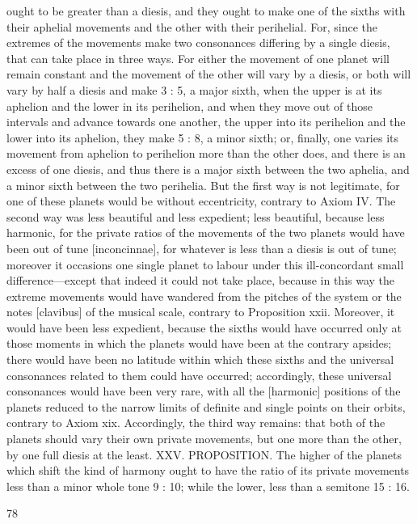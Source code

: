 \documentclass{article}
\begin{document}
ought to be greater than a diesis, and they ought to make one of the
sixths with their aphelial movements and the other with their perihelial.
For, since the extremes of the movements make two consonances
differing by a single diesis, that can take place in three ways. For either
the movement of one planet will remain constant and the movement of
the other will vary by a diesis, or both will vary by half a diesis and make
3 : 5, a major sixth, when the upper is at its aphelion and the lower in its
perihelion, and when they move out of those intervals and advance
towards one another, the upper into its perihelion and the lower into its
aphelion, they make 5 : 8, a minor sixth; or, finally, one varies its
movement from aphelion to perihelion more than the other does, and
there is an excess of one diesis, and thus there is a major sixth between
the two aphelia, and a minor sixth between the two perihelia. But the
first way is not legitimate, for one of these planets would be without
eccentricity, contrary to Axiom IV. The second way was less beautiful
and less expedient; less beautiful, because less harmonic, for the private
ratios of the movements of the two planets would have been out of tune
[inconcinnae], for whatever is less than a diesis is out of tune; moreover
it occasions one single planet to labour under this ill-concordant small
difference—except that indeed it could not take place, because in this
way the extreme movements would have wandered from the pitches of
the system or the notes [clavibus] of the musical scale, contrary to
Proposition xxii. Moreover, it would have been less expedient, because
the sixths would have occurred only at those moments in which the
planets would have been at the contrary apsides; there would have been
no latitude within which these sixths and the universal consonances
related to them could have occurred; accordingly, these universal
consonances would have been very rare, with all the [harmonic]
positions of the planets reduced to the narrow limits of definite and
single points on their orbits, contrary to Axiom xix. Accordingly, the
third way remains: that both of the planets should vary their own private
movements, but one more than the other, by one full diesis at the least.
XXV. PROPOSITION. The higher of the planets which shift the kind of
harmony ought to have the ratio of its private movements less than a
minor whole tone 9 : 10; while the lower, less than a semitone 15 : 16.


78
\end{document}
